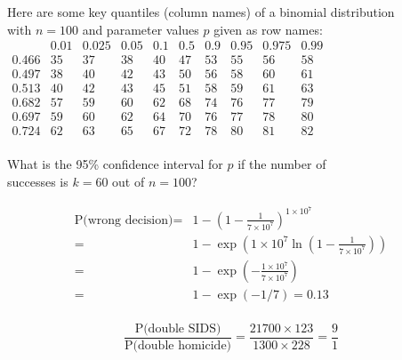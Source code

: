 \documentclass{article}
\begin{document}
\vspace{1cm}

\noindent\begin{minipage}{\linewidth}

Here are some key quantiles (column names) of a binomial distribution\\
with \(n=100\) and parameter values \(p\) given as row names:\\

\( \begin{array}{c|cccccccccc}
  ~ & 0.01 & 0.025 & 0.05 & 0.1 & 0.5 & 0.9 & 0.95 & 0.975 & 0.99 \\ \hline
  0.466 & 35 & 37 & 38 & 40 & 47 & 53 & 55 & 56 & 58 \\
  0.497 & 38 & 40 & 42 & 43 & 50 & 56 & 58 & 60 & 61 \\
  0.513 & 40 & 42 & 43 & 45 & 51 & 58 & 59 & 61 & 63 \\
  0.682 & 57 & 59 & 60 & 62 & 68 & 74 & 76 & 77 & 79 \\
  0.697 & 59 & 60 & 62 & 64 & 70 & 76 & 77 & 78 & 80 \\
  0.724 & 62 & 63 & 65 & 67 & 72 & 78 & 80 & 81 & 82 \\
\end{array} \)\medskip

What  is the  95\%  confidence interval  for \(p\)  if  the number  of\\
successes is \(k=60\) out of \(n=100\)?

\vspace{1cm}

\end{minipage}

\begin{align*}
  \mbox{P(wrong decision)} = & 1 - \left(1 - \frac{1}{7\times{10}^7}\right)^{1\times{10}^7} \\
  = & 1 - \exp\!\left(1\times{10}^7 \ln\!\left(1 - \frac{1}{7\times{10}^7}\right)\right) \\
  = & 1 - \exp\!\left(-\frac{1\times{10}^7}{7\times{10}^7}\right) \\
  = & 1 - \exp(-1/7) = 0.13 \\
\end{align*}

\[
\frac{\mbox{P(double SIDS)}}{\mbox{P(double homicide)}} = \frac{21700 \times 123}{1300 \times 228} = \frac{9}{1}
\]

\vspace{1cm}
\end{document}
